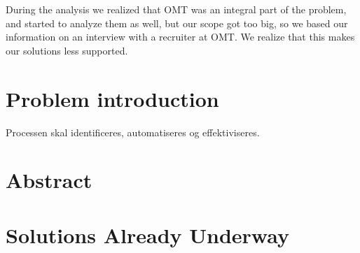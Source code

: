 During the analysis we realized that OMT was an integral part of the problem, and started to analyze them as well, but our scope got too big, so we based our information on an interview with a recruiter at OMT.
We realize that this makes our solutions less supported. 

\section{Problem introduction}

Processen skal identificeres, automatiseres og effektiviseres.
\section{Abstract}


\section{Solutions Already Underway}
